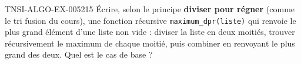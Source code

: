\begin{exercice}{TNSI-ALGO-EX-005}{2}{15}
Écrire, selon le principe \textbf{diviser pour régner} (comme le tri fusion du cours), une fonction récursive \lstinline{maximum_dpr(liste)} qui renvoie le plus grand élément d'une liste non vide : diviser la liste en deux moitiés, trouver récursivement le maximum de chaque moitié, puis combiner en renvoyant le plus grand des deux. Quel est le cas de base ?
\end{exercice}
